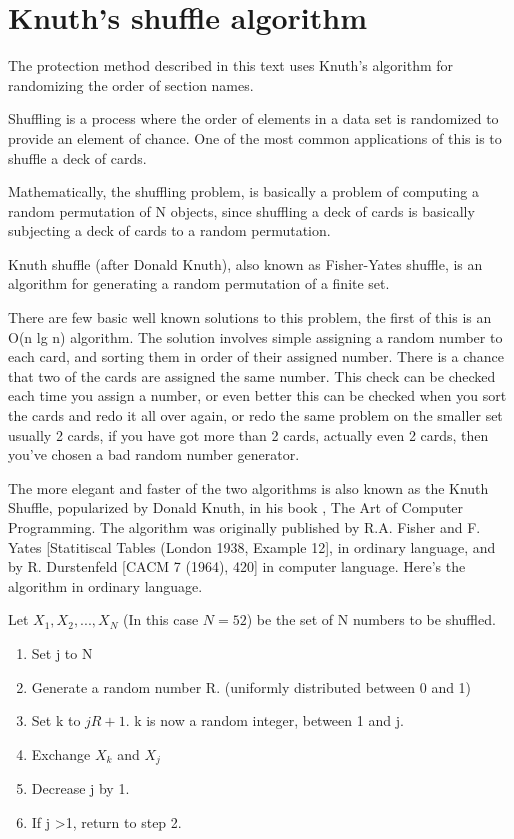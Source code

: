 \documentclass[a4paper,12pt]{article}
\begin{document}
\section{Knuth's shuffle algorithm}
The protection method described in this text uses Knuth's algorithm for
randomizing the order of section names.

Shuffling is a process where the order of elements in a data set is randomized
to provide an element of chance. One of the most common applications of this
is to shuffle a deck of cards.

Mathematically, the shuffling problem, is basically a problem of computing a
random permutation of N objects, since shuffling a deck of cards is basically
subjecting a deck of cards to a random permutation.

Knuth shuffle (after Donald Knuth), also known as Fisher-Yates shuffle, is an
algorithm for generating a random permutation of a finite set.

There are few basic well known solutions to this problem, the first of this is
an O(n lg n) algorithm. The solution involves simple assigning a random number
to each card, and sorting them in order of their assigned number. There is a
chance that two of the cards are assigned the same number. This check can be
checked each time you assign a number, or even better this can be checked when
you sort the cards and redo it all over again, or redo the same problem on the
smaller set usually 2 cards, if you have got more than 2 cards, actually even
2 cards, then you’ve chosen a bad random number generator.

The more elegant and faster of the two algorithms is also known as the Knuth
Shuffle, popularized by Donald Knuth, in his book , The Art of Computer
Programming. The algorithm was originally published by R.A. Fisher and F.
Yates [Statitiscal Tables (London 1938, Example 12], in ordinary language, and
by R. Durstenfeld [CACM 7 (1964), 420] in computer language. Here’s the
algorithm in ordinary language.

Let $X_{1}, X_{2}, ..., X_{N}$ (In this case $N=52$) be the set of N numbers
to be shuffled.

\begin{enumerate}
\item Set j to N
\item Generate a random number R. (uniformly distributed between 0 and 1)
\item Set k to $jR+1$. k is now a random integer, between 1 and j.
\item Exchange $X_{k}$ and $X_{j}$
\item Decrease j by 1.
\item If j \textgreater 1, return to step 2.
\end{enumerate}
\end{document}
